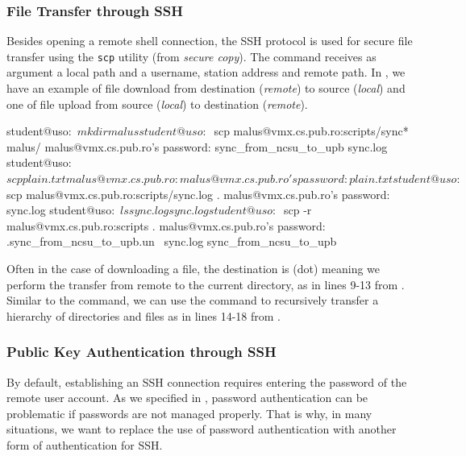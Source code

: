 \subsubsection{File Transfer through SSH}
\label{sec:sec:transfer:ssh:transfer}

Besides opening a remote shell connection, the SSH protocol is used for secure file transfer using the \texttt{scp} utility (from \textit{secure copy}).
The  command receives as argument a local path and a username, station address and remote path.
In , we have an example of file download from destination (\textit{remote}) to source (\textit{local}) and one of file upload from source (\textit{local}) to destination (\textit{remote}).

\begin{screen}[caption={File transfer through SSH (scp)},label={lst:sec:scp}]
student@uso:~$ mkdir malus
student@uso:~$ scp malus@vmx.cs.pub.ro:scripts/sync* malus/
malus@vmx.cs.pub.ro's password:
sync_from_ncsu_to_upb
sync.log
student@uso:~$ scp plain.txt malus@vmx.cs.pub.ro:
malus@vmx.cs.pub.ro's password:
plain.txt
student@uso:~$ scp malus@vmx.cs.pub.ro:scripts/sync.log .
malus@vmx.cs.pub.ro's password:
sync.log
student@uso:~$ ls sync.log
sync.log
student@uso:~$ scp -r malus@vmx.cs.pub.ro:scripts .
malus@vmx.cs.pub.ro's password:
.sync_from_ncsu_to_upb.un~
sync.log
sync_from_ncsu_to_upb
\end{screen}

Often in the case of downloading a file, the destination is  (dot) meaning we perform the transfer from remote to the current directory, as in lines 9-13 from .
Similar to the  command, we can use the  command to recursively transfer a hierarchy of directories and files as in lines 14-18 from .

\subsubsection{Public Key Authentication through SSH}
\label{sec:sec:transfer:ssh:pub-auth}

By default, establishing an SSH connection requires entering the password of the remote user account.
As we specified in , password authentication can be problematic if passwords are not managed properly.
That is why, in many situations, we want to replace the use of password authentication with another form of authentication for SSH.

